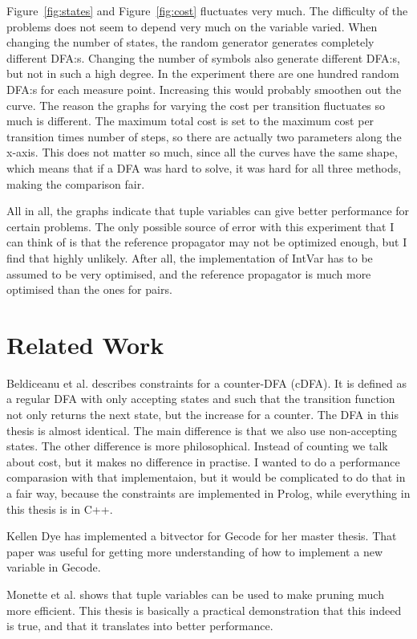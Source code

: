 \documentclass[a4paper,11pt]{article}
\begin{document}
Figure~\ref{fig:states} and Figure~\ref{fig:cost} fluctuates very much. The difficulty of the problems does not seem to depend very much on the variable varied. When changing the number of states, the random generator generates completely different DFA:s. Changing the number of symbols also generate different DFA:s, but not in such a high degree. In the experiment there are one hundred random DFA:s for each measure point. Increasing this would probably smoothen out the curve. The reason the graphs for varying the cost per transition fluctuates so much is different. The maximum total cost is set to the maximum cost per transition times number of steps, so there are actually two parameters along the x-axis. This does not matter so much, since all the curves have the same shape, which means that if a DFA was hard to solve, it was hard for all three methods, making the comparison fair. 

All in all, the graphs indicate that tuple variables can give better performance for certain problems. The only possible source of error with this experiment that I can think of is that the reference propagator may not be optimized enough, but I find that highly unlikely. After all, the implementation of IntVar has to be assumed to be very optimised, and the reference propagator is much more optimised than the ones for pairs.

\section{Related Work}
Beldiceanu et al. \cite{Beldiceanu675954} describes constraints for a counter-DFA (cDFA). It is defined as a regular DFA with only accepting states and such that the transition function not only returns the next state, but the increase for a counter. The DFA in this thesis is almost identical. The main difference is that we also use non-accepting states. The other difference is more philosophical. Instead of counting we talk about cost, but it makes no difference in practise. I wanted to do a performance comparasion with that implementaion, but it would be complicated to do that in a fair way, because the constraints are implemented in Prolog, while everything in this thesis is in C++.

Kellen Dye has implemented a bitvector for Gecode for her master thesis.\cite{Dye761927} That paper was useful for getting more understanding of how to implement a new variable in Gecode.

Monette et al.\cite{Monette771427} shows that tuple variables can be used to make pruning much more efficient. This thesis is basically a practical demonstration that this indeed is true, and that it translates into better performance.
\end{document}
